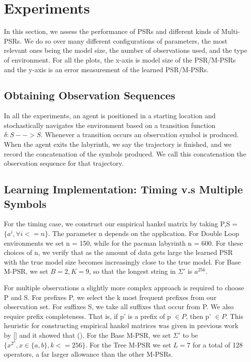 \section{Experiments}
In this section, we assess the performance of PSRs and different kinds of Multi-PSRs. We do so over many different configurations of parameters, the most relevant ones being the model size, the number of observations used, and the type of environment. For all the plots, the x-axis is model size of the PSR/M-PSRs and the y-axis is an error measurement of the learned PSR/M-PSRs.

\subsection{Obtaining Observation Sequences}
In all the experiments, an agent is positioned in a starting location and stochastically navigates the environment based on a transition function $\delta:S-->S$. Whenever a transition occurs an observation symbol is produced. When the agent exits the labyrinth, we say the trajectory is finished, and we record the concatenation of the symbols produced. We call this concatenation the observation sequence for that trajectory.  

\subsection{Learning Implementation: Timing v.s Multiple Symbols}

For the timing case, we construct our empirical hankel matrix by taking P,S = $\{a^i, \forall i<=n\}$. The parameter n depends on the application. For Double Loop environments we set n = 150, while for the pacman labyrinth n = 600. For these choices of n, we verify that as the amount of data gets large the learned PSR with the true model size becomes increasingly close to the true model. For Base M-PSR, we set $B=2,K=9$, so that the longest string in $\Sigma'$ is $a^256$.

For multiple observations a slightly more complex approach is required to choose P and S. For prefixes P, we select the k most frequent prefixes from our observation set. For suffixes S, we take all suffixes that occur from P. We also require prefix completeness. That is, if p' is a prefix of p $\in P$, then p' $\in P$. This heuristic for constructing empirical hankel matrices was given in previous work by [] and it showed that (). For the Base M-PSR, we set $\Sigma'$ to be $\{x^{2^k}, x \in \{a,b\}, k<=256 \}$. For the Tree M-PSR we set $L=7$ for a total of 128 operators, a far larger allowance than the other M-PSRs. 

